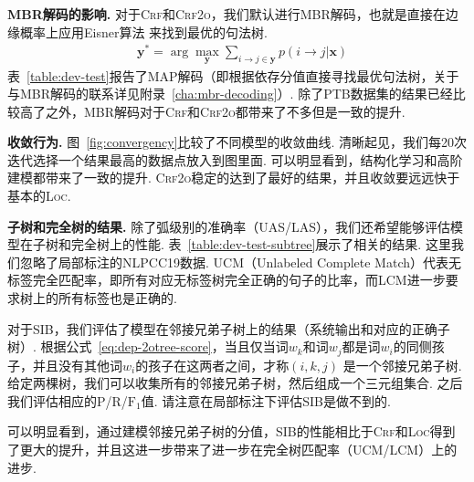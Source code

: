 \noindent\textbf{MBR解码的影响.}
对于\textsc{Crf}和\textsc{Crf2o}，我们默认进行MBR解码，也就是直接在边缘概率上应用Eisner算法 \citep{smith-smith-2007-probabilistic}来找到最优的句法树.
\begin{equation}
  \begin{split}
    & {\boldsymbol{y}}^* = \arg\max_{\boldsymbol{y}} \sum_{i \rightarrow j \in \boldsymbol{y}}{p(i \rightarrow j|\boldsymbol{x})}
  \end{split}
\end{equation}
表~\ref{table:dev-test}报告了MAP解码（即根据依存分值直接寻找最优句法树，关于与MBR解码的联系详见附录~\ref{cha:mbr-decoding}）.
除了PTB数据集的结果已经比较高了之外，MBR解码对于\textsc{Crf}和\textsc{Crf2o}都带来了不多但是一致的提升.

\noindent\textbf{收敛行为.}
图~\ref{fig:convergency}比较了不同模型的收敛曲线.
清晰起见，我们每20次迭代选择一个结果最高的数据点放入到图里面.
可以明显看到，结构化学习和高阶建模都带来了一致的提升.
\textsc{Crf2o}稳定的达到了最好的结果，并且收敛要远远快于基本的\textsc{Loc}.



\noindent\textbf{子树和完全树的结果.}
除了弧级别的准确率（UAS/LAS），我们还希望能够评估模型在子树和完全树上的性能.
表~\ref{table:dev-test-subtree}展示了相关的结果.
这里我们忽略了局部标注的NLPCC19数据.
UCM（Unlabeled Complete Match）代表无标签完全匹配率，即所有对应无标签树完全正确的句子的比率，而LCM进一步要求树上的所有标签也是正确的.

对于SIB，我们评估了模型在邻接兄弟子树上的结果（系统输出和对应的正确子树）.
根据公式~\ref{eq:dep-2otree-score}，当且仅当词$w_k$和词$w_j$都是词$w_i$的同侧孩子，并且没有其他词$w_i$的孩子在这两者之间，才称$(i,k,j)$ 是一个邻接兄弟子树.
给定两棵树，我们可以收集所有的邻接兄弟子树，然后组成一个三元组集合.
之后我们评估相应的P/R/$\mathrm{F}_1$值.
请注意在局部标注下评估SIB是做不到的.

可以明显看到，通过建模邻接兄弟子树的分值，SIB的性能相比于\textsc{Crf}和\textsc{Loc}得到了更大的提升，并且这进一步带来了进一步在完全树匹配率（UCM/LCM）上的进步.

